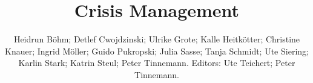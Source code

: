 \documentclass[11pt]{book}
\title{Crisis Management}
\author{Heidrun Böhm; Detlef Cwojdzinski; Ulrike Grote; Kalle Heitkötter; Christine Knauer; Ingrid Möller; Guido Pukropski; Julia Sasse; Tanja Schmidt; Ute Siering; Karlin Stark; Katrin Steul; Peter Tinnemann. Editors: Ute Teichert; Peter Tinnemann.}
\begin{document}
\maketitle
\def\title#1{\chapter{#1}}
\tableofcontents

        
        
        
        
        
        
        
        
        
        
        
        
        
        
        
        
        
        
        
        
        
        
        
        
        
        
        
        
        
        
        
        
\end{document}
